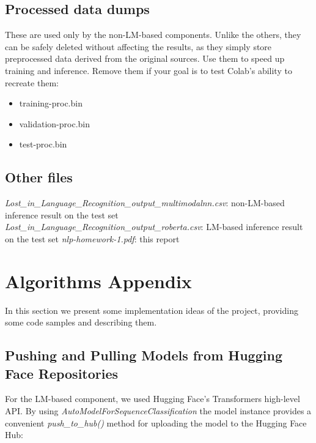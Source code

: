 \documentclass[11pt]{article}
\begin{document}
	 \subsection{Processed data dumps}
	 
	 These are used only by the non-LM-based components. Unlike the others, 
	 they can be safely deleted without affecting the results, 
	 as they simply store preprocessed data derived from the original sources. 
	 Use them to speed up training and inference. 
	 Remove them if your goal is to test Colab’s ability to recreate them:
	 
	 \begin{itemize}
	 	\item training-proc.bin
	 	\item validation-proc.bin
	 	\item test-proc.bin
	 \end{itemize}
	
	\subsection{Other files}
	
	\emph{Lost\_in\_Language\_Recognition\_output\_multimodalnn.csv}: non-LM-based inference result on the test set
	\emph{Lost\_in\_Language\_Recognition\_output\_roberta.csv}: LM-based inference result on the test set
	\emph{nlp-homework-1.pdf}: this report
	
\section{Algorithms  Appendix}
\label{sec:appendix}
In this section we present some implementation ideas of the project, providing some code samples and describing them.
	
\subsection{Pushing and Pulling Models from Hugging Face Repositories}
For the LM-based component, we used Hugging Face’s Transformers high-level API. By using \emph{AutoModelForSequenceClassification}  the model instance provides a convenient 
	\emph{push\_to\_hub()} method for uploading the model to the Hugging Face Hub:
	
\end{document}
